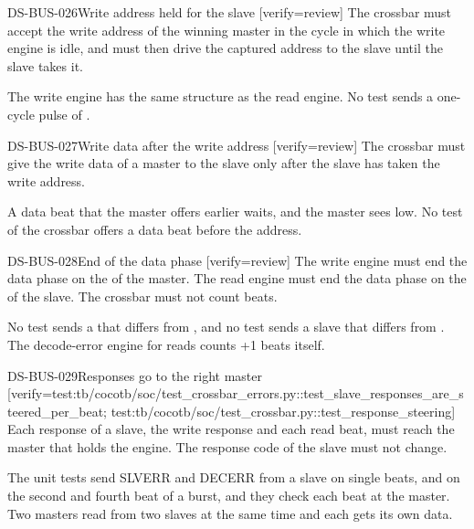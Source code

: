 \begin{requirement}{DS-BUS-026}{Write address held for the slave}
[verify={review}]
The crossbar must accept the write address of the winning master in the cycle in which the write engine is idle, and must then drive the captured address to the slave until the slave takes it.
\end{requirement}
\begin{information}
The write engine has the same structure as the read engine. No test sends a one-cycle pulse of .
\end{information}

\begin{requirement}{DS-BUS-027}{Write data after the write address}
[verify={review}]
The crossbar must give the write data of a master to the slave only after the slave has taken the write address.
\end{requirement}
\begin{information}
A data beat that the master offers earlier waits, and the master sees  low. No test of the crossbar offers a data beat before the address.
\end{information}

\begin{requirement}{DS-BUS-028}{End of the data phase}
[verify={review}]
The write engine must end the data phase on the  of the master. The read engine must end the data phase on the  of the slave. The crossbar must not count beats.
\end{requirement}
\begin{information}
No test sends a  that differs from , and no test sends a slave  that differs from . The decode-error engine for reads counts +1 beats itself.
\end{information}

\begin{requirement}{DS-BUS-029}{Responses go to the right master}
[verify={test:tb/cocotb/soc/test_crossbar_errors.py::test_slave_responses_are_steered_per_beat; test:tb/cocotb/soc/test_crossbar.py::test_response_steering}]
Each response of a slave, the write response and each read beat, must reach the master that holds the engine. The response code of the slave must not change.
\end{requirement}
\begin{information}
The unit tests send SLVERR and DECERR from a slave on single beats, and on the second and fourth beat of a burst, and they check each beat at the master. Two masters read from two slaves at the same time and each gets its own data.
\end{information}

